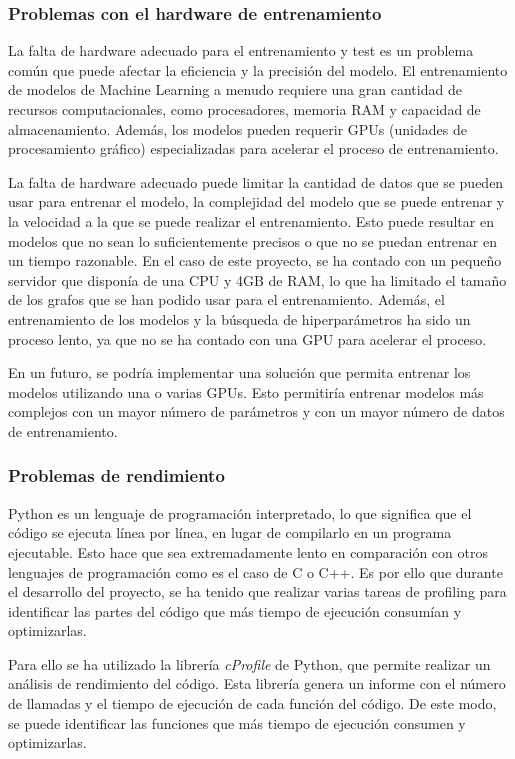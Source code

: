 \subsubsection{Problemas con el hardware de entrenamiento}
La falta de hardware adecuado para el entrenamiento y test es un problema común 
que puede afectar la eficiencia y la precisión del modelo. El entrenamiento de modelos 
de Machine Learning a menudo requiere una gran cantidad de recursos computacionales, 
como procesadores, memoria RAM y capacidad de almacenamiento. Además, los modelos 
pueden requerir GPUs (unidades de procesamiento gráfico) especializadas para acelerar 
el proceso de entrenamiento.\medskip

La falta de hardware adecuado puede limitar la cantidad de datos que se pueden usar 
para entrenar el modelo, la complejidad del modelo que se puede entrenar y la 
velocidad a la que se puede realizar el entrenamiento. Esto puede resultar en 
modelos que no sean lo suficientemente precisos o que no se puedan entrenar en 
un tiempo razonable. En el caso de este proyecto, se ha contado con un pequeño
servidor que disponía de una CPU y 4GB de RAM, lo que ha limitado el tamaño de los
grafos que se han podido usar para el entrenamiento. Además, el entrenamiento de
los modelos y la búsqueda de hiperparámetros ha sido un proceso lento, ya que
no se ha contado con una GPU para acelerar el proceso.\medskip

En un futuro, se podría implementar una solución que permita entrenar los modelos
utilizando una o varias GPUs. Esto permitiría entrenar modelos más complejos
con un mayor número de parámetros y con un mayor número de datos de entrenamiento.

\subsubsection{Problemas de rendimiento}
Python es un lenguaje de programación interpretado, lo que significa que el código
se ejecuta línea por línea, en lugar de compilarlo en un programa ejecutable. Esto
hace que sea extremadamente lento en comparación con otros lenguajes de programación
como es el caso de C o C++. Es por ello que durante el desarrollo del proyecto, se
ha tenido que realizar varias tareas de profiling para identificar las partes del
código que más tiempo de ejecución consumían y optimizarlas.\medskip

Para ello se ha utilizado la librería \textit{cProfile} de Python, que permite
realizar un análisis de rendimiento del código. Esta librería genera un informe
con el número de llamadas y el tiempo de ejecución de cada función del código.
De este modo, se puede identificar las funciones que más tiempo de ejecución
consumen y optimizarlas.\medskip

